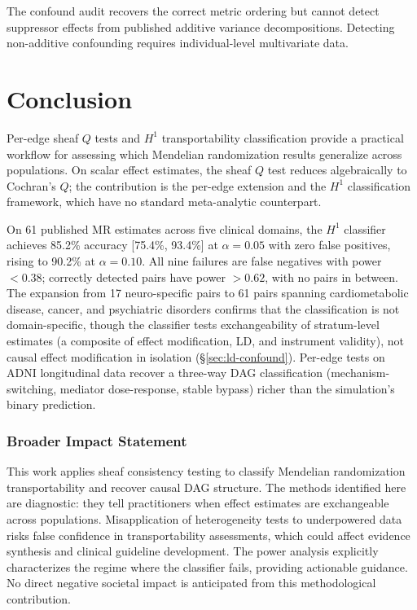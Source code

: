 \documentclass[11pt]{article}
\begin{document}
The confound audit recovers the correct metric ordering but cannot detect suppressor effects from published additive variance decompositions.
Detecting non-additive confounding requires individual-level multivariate data.

\section{Conclusion}
\label{sec:conclusion}

Per-edge sheaf $Q$ tests and $H^1$ transportability classification provide a practical workflow for assessing which Mendelian randomization results generalize across populations. On scalar effect estimates, the sheaf $Q$ test reduces algebraically to Cochran's $Q$; the contribution is the per-edge extension and the $H^1$ classification framework, which have no standard meta-analytic counterpart.

On 61 published MR estimates across five clinical domains, the $H^1$ classifier achieves 85.2\% accuracy [75.4\%, 93.4\%] at $\alpha = 0.05$ with zero false positives, rising to 90.2\% at $\alpha = 0.10$.
All nine failures are false negatives with power $< 0.38$; correctly detected pairs have power $> 0.62$, with no pairs in between.
The expansion from 17 neuro-specific pairs to 61 pairs spanning cardiometabolic disease, cancer, and psychiatric disorders confirms that the classification is not domain-specific, though the classifier tests exchangeability of stratum-level estimates (a composite of effect modification, LD, and instrument validity), not causal effect modification in isolation (\S\ref{sec:ld-confound}).
Per-edge tests on ADNI longitudinal data recover a three-way DAG classification (mechanism-switching, mediator dose-response, stable bypass) richer than the simulation's binary prediction.

\subsubsection*{Broader Impact Statement}
This work applies sheaf consistency testing to classify Mendelian randomization transportability and recover causal DAG structure. The methods identified here are diagnostic: they tell practitioners when effect estimates are exchangeable across populations. Misapplication of heterogeneity tests to underpowered data risks false confidence in transportability assessments, which could affect evidence synthesis and clinical guideline development. The power analysis explicitly characterizes the regime where the classifier fails, providing actionable guidance. No direct negative societal impact is anticipated from this methodological contribution.
\end{document}
